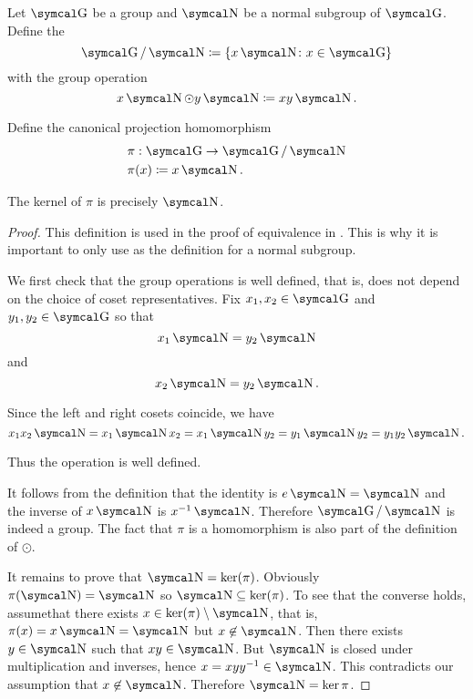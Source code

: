 \begin{definition}\label{def:quotient_group}
  Let \( \CG \) be a group and \( \CN \) be a normal subgroup of \( \CG \). Define the 
  \begin{equation*}
    \CG / \CN \coloneqq \{ x \CN \colon x \in \CG \}
  \end{equation*}
  with the group operation
  \begin{equation*}
    x \CN \odot y \CN \coloneqq xy \CN.
  \end{equation*}

  Define the canonical projection homomorphism
  \begin{align*}
    &\pi: \CG \to \CG / \CN \\
    &\pi(x) \coloneqq x \CN.
  \end{align*}

  The kernel of \( \pi \) is precisely \( \CN \).
\end{definition}
\begin{proof}
  This definition is used in the proof of equivalence in . This is why it is important to only use  as the definition for a normal subgroup.

  We first check that the group operations is well defined, that is, does not depend on the choice of coset representatives. Fix \( x_1, x_2 \in \CG \) and \( y_1, y_2 \in \CG \) so that
  \begin{equation*}
    x_1 \CN = y_2 \CN
  \end{equation*}
  and
  \begin{equation*}
    x_2 \CN = y_2 \CN.
  \end{equation*}

  Since the left and right cosets coincide, we have
  \begin{equation*}
    x_1 x_2 \CN = x_1 \CN x_2 = x_1 \CN y_2 = y_1 \CN y_2 = y_1 y_2 \CN.
  \end{equation*}

  Thus the operation is well defined.

  It follows from the definition that the identity is \( e \CN = \CN \) and the inverse of \( x \CN \) is \( x^{-1} \CN \). Therefore \( \CG / \CN \) is indeed a group. The fact that \( \pi \) is a homomorphism is also part of the definition of \( \odot \).

  It remains to prove that \( \CN = \ker(\pi) \). Obviously \( \pi(\CN) = \CN \) so \( \CN \subseteq \ker(\pi) \). To see that the converse holds, assume\LEM that there exists \( x \in \ker(\pi) \setminus \CN \), that is, \( \pi(x) = x\CN = \CN \) but \( x \not\in \CN \). Then there exists \( y \in \CN \) such that \( xy \in \CN \). But \( \CN \) is closed under multiplication and inverses, hence \( x = xyy^{-1} \in \CN \). This contradicts our assumption that \( x \not\in \CN \). Therefore \( \CN = \ker \pi \).
\end{proof}


